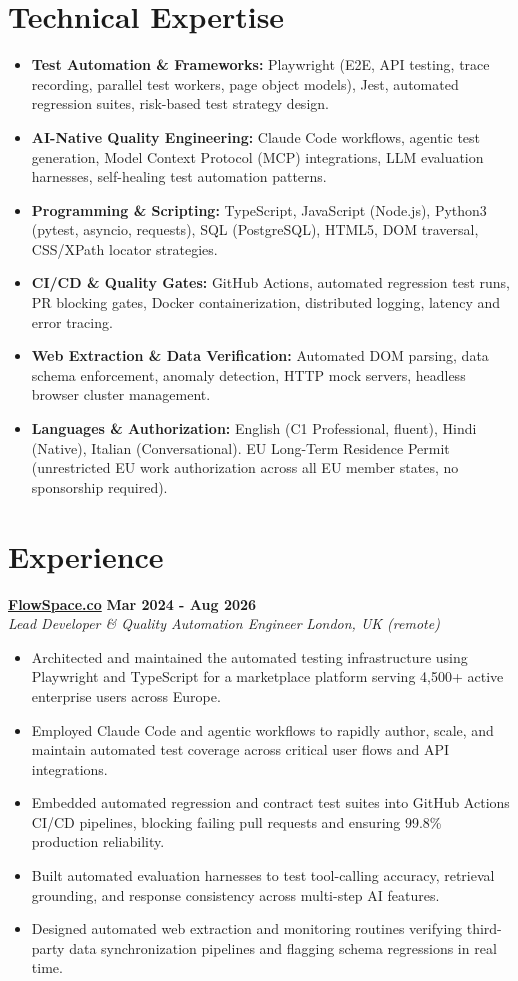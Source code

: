 \documentclass[10pt,a4paper]{article}
\newcommand{\role}[4]{%
  \textbf{#1} \hfill \textbf{#2}\\[1pt]%
  \textit{#3} \hfill \textit{#4}\\[2pt]%
}
\begin{document}
\section{Technical Expertise}
\begin{itemize}
  \item \textbf{Test Automation \& Frameworks:} Playwright (E2E, API testing, trace recording, parallel test workers, page object models), Jest, automated regression suites, risk-based test strategy design.
  \item \textbf{AI-Native Quality Engineering:} Claude Code workflows, agentic test generation, Model Context Protocol (MCP) integrations, LLM evaluation harnesses, self-healing test automation patterns.
  \item \textbf{Programming \& Scripting:} TypeScript, JavaScript (Node.js), Python3 (pytest, asyncio, requests), SQL (PostgreSQL), HTML5, DOM traversal, CSS/XPath locator strategies.
  \item \textbf{CI/CD \& Quality Gates:} GitHub Actions, automated regression test runs, PR blocking gates, Docker containerization, distributed logging, latency and error tracing.
  \item \textbf{Web Extraction \& Data Verification:} Automated DOM parsing, data schema enforcement, anomaly detection, HTTP mock servers, headless browser cluster management.
  \item \textbf{Languages \& Authorization:} English (C1 Professional, fluent), Hindi (Native), Italian (Conversational). EU Long-Term Residence Permit (unrestricted EU work authorization across all EU member states, no sponsorship required).
\end{itemize}

\section{Experience}

\role{\href{https://flowspace.co}{FlowSpace.co}}{Mar 2024 - Aug 2026}{Lead Developer \& Quality Automation Engineer}{London, UK (remote)}
\begin{itemize}
  \item Architected and maintained the automated testing infrastructure using Playwright and TypeScript for a marketplace platform serving 4,500+ active enterprise users across Europe.
  \item Employed Claude Code and agentic workflows to rapidly author, scale, and maintain automated test coverage across critical user flows and API integrations.
  \item Embedded automated regression and contract test suites into GitHub Actions CI/CD pipelines, blocking failing pull requests and ensuring 99.8\% production reliability.
  \item Built automated evaluation harnesses to test tool-calling accuracy, retrieval grounding, and response consistency across multi-step AI features.
  \item Designed automated web extraction and monitoring routines verifying third-party data synchronization pipelines and flagging schema regressions in real time.
\end{itemize}
\end{document}
